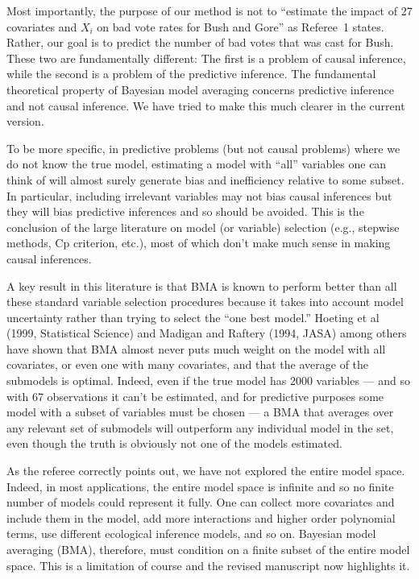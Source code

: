 \documentclass[11pt]{article}
\begin{document}
\begin{enumerate}
  Most importantly, the purpose of our method is not to ``estimate the
  impact of 27 covariates and $X_i$ on bad vote rates for Bush and
  Gore'' as Referee~1 states. Rather, our goal is to predict the
  number of bad votes that was cast for Bush.  These two are
  fundamentally different: The first is a problem of causal inference,
  while the second is a problem of the predictive inference. The
  fundamental theoretical property of Bayesian model averaging
  concerns predictive inference and not causal inference.  We have
  tried to make this much clearer in the current version.
  
  To be more specific, in predictive problems (but not causal
  problems) where we do not know the true model, estimating a model
  with ``all'' variables one can think of will almost surely generate
  bias and inefficiency relative to some subset.  In particular,
  including irrelevant variables may not bias causal inferences but
  they will bias predictive inferences and so should be avoided.  This
  is the conclusion of the large literature on model (or variable)
  selection (e.g., stepwise methods, Cp criterion, etc.), most of
  which don't make much sense in making causal inferences.
  
  A key result in this literature is that BMA is known to perform
  better than all these standard variable selection procedures because
  it takes into account model uncertainty rather than trying to select
  the ``one best model.''  Hoeting et al (1999, Statistical Science)
  and Madigan and Raftery (1994, JASA) among others have shown that
  BMA almost never puts much weight on the model with all covariates,
  or even one with many covariates, and that the average of the
  submodels is optimal.  Indeed, even if the true model has 2000
  variables --- and so with 67 observations it can't be estimated, and
  for predictive purposes some model with a subset of variables must
  be chosen --- a BMA that averages over any relevant set of submodels
  will outperform any individual model in the set, even though the
  truth is obviously not one of the models estimated.
  
  As the referee correctly points out, we have not explored the entire
  model space. Indeed, in most applications, the entire model space is
  infinite and so no finite number of models could represent it fully.
  One can collect more covariates and include them in the model, add
  more interactions and higher order polynomial terms, use different
  ecological inference models, and so on.  Bayesian model averaging
  (BMA), therefore, must condition on a finite subset of the entire
  model space.  This is a limitation of course and the revised
  manuscript now highlights it.
  

\end{enumerate}
\end{document}
